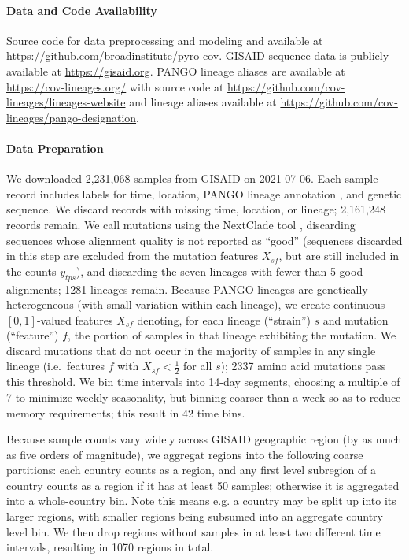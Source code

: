\documentclass[12pt]{article}
\begin{document}
\paragraph*{Data and Code Availability}

Source code for data preprocessing and modeling and available at
\url{https://github.com/broadinstitute/pyro-cov}.
GISAID sequence data is publicly available at
\url{https://gisaid.org}.
PANGO lineage aliases are available at \url{https://cov-lineages.org/} with source code at \url{https://github.com/cov-lineages/lineages-website} and lineage aliases available at \url{https://github.com/cov-lineages/pango-designation}.

\paragraph*{Data Preparation}

We downloaded 2,231,068 samples from GISAID 
\cite{elbe2017gisaid} on 2021-07-06.
Each sample record includes labels for time, location, PANGO lineage annotation \cite{rambaut2020dynamic}, and genetic sequence.
We discard records with missing time, location, or lineage; 2,161,248 records remain.
We call mutations using the NextClade tool \cite{aksamentov2020nextclade}, discarding sequences whose alignment quality is not reported as ``good'' (sequences discarded in this step are excluded from the mutation features $X_{sf}$, but are still included in the counts $y_{tps}$), and discarding the seven lineages with fewer than 5 good alignments; 1281 lineages remain.
Because PANGO lineages are genetically heterogeneous (with small variation within each lineage), we create continuous $[0, 1]$-valued features $X_{sf}$ denoting, for each lineage (``strain'') $s$ and mutation (``feature'') $f$, the portion of samples in that lineage exhibiting the mutation.
We discard mutations that do not occur in the majority of samples in any single lineage (i.e.~features $f$ with $X_{sf}<\tfrac{1}{2}$ for all $s$); 2337 amino acid mutations pass this threshold.
We bin time intervals into 14-day segments, choosing a multiple of 7 to minimize weekly seasonality, but binning coarser than a week so as to reduce memory requirements; this result in 42 time bins.

Because sample counts vary widely across GISAID geographic region (by as much as five orders of magnitude), we aggregat regions into the following coarse partitions: each country counts as a region, and any first level subregion of a country counts as a region if it has at least 50 samples; otherwise it is aggregated into a whole-country bin.
Note this means e.g. a country may be split up into its larger regions, with smaller regions being subsumed into an aggregate country level bin.
We then drop regions without samples in at least two different time intervals, resulting in 1070 regions in total.
\end{document}
